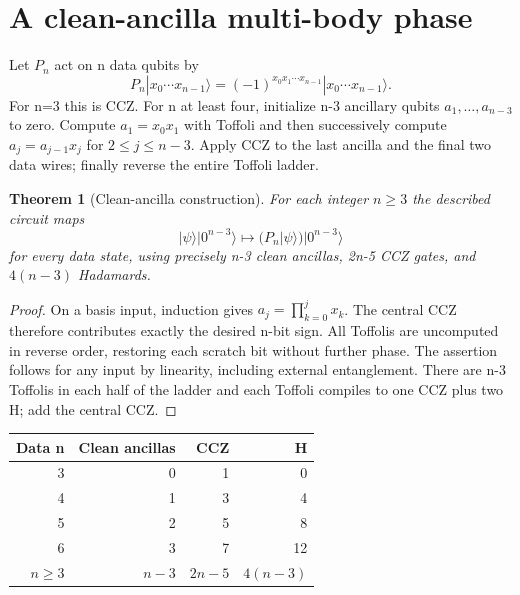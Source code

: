 \documentclass[11pt,a4paper]{article}
\newtheorem{theorem}{Theorem}
\begin{document}
\section{A clean-ancilla multi-body phase}
Let $P_n$ act on n data qubits by
\[
P_n|x_0\cdots x_{n-1}\rangle =
(-1)^{x_0x_1\cdots x_{n-1}}|x_0\cdots x_{n-1}\rangle.
\]
For n=3 this is CCZ. For n at least four, initialize n-3 ancillary qubits $a_1,\ldots,a_{n-3}$ to zero. Compute $a_1=x_0x_1$ with Toffoli and then successively compute $a_j=a_{j-1}x_j$ for $2\le j\le n-3$. Apply CCZ to the last ancilla and the final two data wires; finally reverse the entire Toffoli ladder.
\begin{theorem}[Clean-ancilla construction]
For each integer $n\ge3$ the described circuit maps
\[
|\psi\rangle|0^{n-3}\rangle\longmapsto
(P_n|\psi\rangle)|0^{n-3}\rangle
\]
for every data state, using precisely n-3 clean ancillas, 2n-5 CCZ gates, and $4(n-3)$ Hadamards.
\end{theorem}
\begin{proof}
On a basis input, induction gives $a_j=\prod_{k=0}^{j}x_k$. The central CCZ therefore contributes exactly the desired n-bit sign. All Toffolis are uncomputed in reverse order, restoring each scratch bit without further phase. The assertion follows for any input by linearity, including external entanglement. There are n-3 Toffolis in each half of the ladder and each Toffoli compiles to one CCZ plus two H; add the central CCZ.
\end{proof}
\begin{center}
\begin{tabular}{rrrr}\toprule
Data n & Clean ancillas & CCZ & H\\\midrule
3&0&1&0\\4&1&3&4\\5&2&5&8\\
6&3&7&12\\$n\ge3$&$n-3$&$2n-5$&$4(n-3)$\\\bottomrule
\end{tabular}
\end{center}
\end{document}
